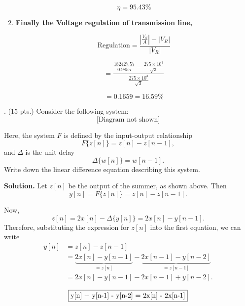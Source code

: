 \documentclass[12pt]{article}
\begin{document}
\begin{enumerate}
	\begin{equation}
		\eta = 95.43\%
	\end{equation}
	
	
	
	\item \textbf{Finally the Voltage  regulation of transmission line,}
	
	\begin{equation}
		\text{Regulation} = \frac{\left| \frac{V_S}{A} \right| - |V_R|}{|V_R|}
	\end{equation}
	
	
	\[ = \frac{\frac{182427.57}{0.9855} - \frac{275 \times 10^3}{\sqrt{3}}}{\frac{275 \times 10^3}{\sqrt{3}}}  \]
	
	\begin{equation}
		= 0.1659 = 16.59\%
	\end{equation}
	
    \end{enumerate}

	
	
	. (15 pts.) Consider the following system:
	\[
	\text{[Diagram not shown]}
	\]
	
	Here, the system \( F \) is defined by the input-output relationship
	\[
	F\{z[n]\} = z[n] - z[n-1],
	\]
	and \( \Delta \) is the unit delay
	\[
	\Delta\{w[n]\} = w[n-1].
	\]
	Write down the linear difference equation describing this system.
	
	\textbf{Solution.} Let \( z[n] \) be the output of the summer, as shown above. Then
	\[
	y[n] = F\{z[n]\} = z[n] - z[n-1].
	\]
	
	Now,
	\[
	z[n] = 2x[n] - \Delta\{y[n]\} = 2x[n] - y[n-1].
	\]
	Therefore, substituting the expression for \( z[n] \) into the first equation, we can write
	\[
	\begin{aligned}
		y[n] &= z[n] - z[n-1] \\
		&= \underbrace{2x[n] - y[n-1]}_{=z[n]} - \underbrace{2x[n-1] - y[n-2]}_{=z[n-1]} \\
		&= 2x[n] - y[n-1] - 2x[n-1] + y[n-2].
	\end{aligned}
	\]
	
	\[
	\fbox{y[n] + y[n-1] - y[n-2] = 2x[n] - 2x[n-1]}
	\]
	
	
	
	
	
\end{document}
